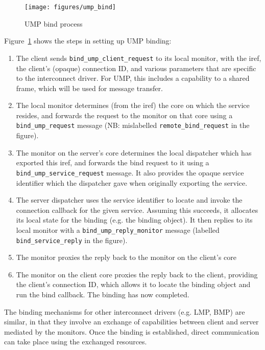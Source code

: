 \documentclass[a4paper,twoside]{report} %
\begin{document}
\begin{figure}
  \texttt{[image: figures/ump\_bind]}
  \caption{UMP bind process}\label{fig:ump_bind}
\end{figure}

Figure~\ref{fig:ump_bind} shows the steps in setting up UMP binding:
\begin{enumerate}
 \item The client sends \lstinline+bind_ump_client_request+ to its local monitor,
      with the iref, the client's (opaque) connection ID, and various parameters
      that are specific to the interconnect driver. For UMP, this includes a
      capability to a shared frame, which will be used for message transfer.
 \item The local monitor determines (from the iref) the core on which the
      service resides, and forwards the request to the monitor on that core
      using a \lstinline+bind_ump_request+ message (NB: mislabelled
      \lstinline+remote_bind_request+ in the figure).
 \item The monitor on the server's core determines the local dispatcher which
      has exported this iref, and forwards the bind request to it using a
      \lstinline+bind_ump_service_request+ message. It also provides the
      opaque service identifier which the dispatcher gave when originally
      exporting the service.
 \item The server dispatcher uses the service identifier to locate and invoke
      the connection callback for the given service. Assuming this succeeds, it
      allocates its local state for the binding (e.g. the binding object). It
      then replies to its local monitor with a
      \lstinline+bind_ump_reply_monitor+ message (labelled
      \lstinline+bind_service_reply+ in the figure).
 \item The monitor proxies the reply back to the monitor on the client's core
 \item The monitor on the client core proxies the reply back to the client,
      providing the client's connection ID, which allows it to locate the
      binding object and run the bind callback. The binding has now completed.
\end{enumerate}

The binding mechanisms for other interconnect drivers (e.g. LMP, BMP) are
similar, in that they involve an exchange of capabilities between client and
server mediated by the monitors. Once the binding is established, direct
communication can take place using the exchanged resources.
\end{document}
